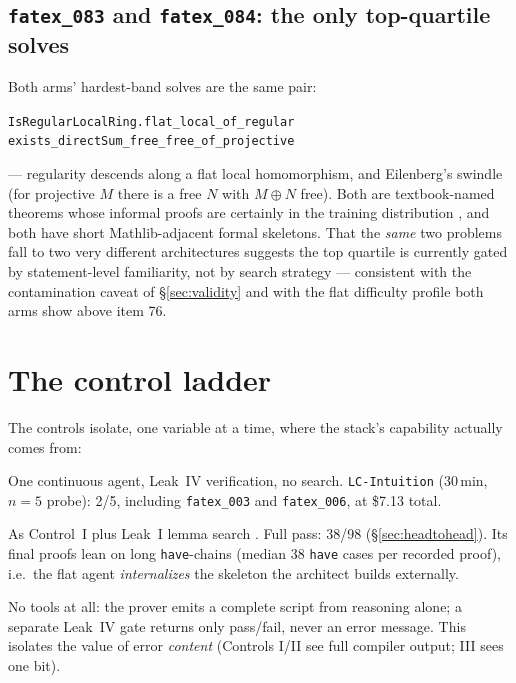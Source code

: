 \documentclass[12pt, a4paper]{article}
\newcommand{\run}[1]{\texttt{#1}}
\begin{document}
\subsection{\run{fatex\_083} and \run{fatex\_084}: the only top-quartile solves}

Both arms' hardest-band solves are the same pair:
\begin{center}\small
\run{IsRegularLocalRing.flat\_local\_of\_regular}\\
\run{exists\_directSum\_free\_free\_of\_projective}
\end{center}
\noindent
--- regularity descends along a flat local homomorphism, and Eilenberg's
swindle (for projective $M$ there is a free $N$ with $M \oplus N$ free). Both are
textbook-named theorems whose informal proofs are certainly in the training
distribution \cite{anthropic2026sonnet5}, and both have short Mathlib-adjacent
formal skeletons. That the \emph{same} two problems fall to two very
different architectures suggests the top quartile is currently gated by
statement-level familiarity, not by search strategy --- consistent with the
contamination caveat of \S\ref{sec:validity} and with the flat difficulty
profile both arms show above item 76.

\section{The control ladder}
\label{sec:controls}

The controls isolate, one variable at a time, where the stack's capability
actually comes from:

\begin{description}[itemsep=2pt]
\item[Control I --- compiler only.] One continuous agent, Leak~IV verification,
  no search. \run{LC-Intuition} (30\,min, $n{=}5$ probe): 2/5, including
  \run{fatex\_003} and \run{fatex\_006}, at \$7.13 total.
\item[Control II --- compiler + search.] As Control~I plus Leak~I lemma search
  \cite{loogle}. Full pass: 38/98 (\S\ref{sec:headtohead}). Its final proofs
  lean on long \texttt{have}-chains (median 38 \texttt{have} cases per
  recorded proof), i.e.\ the flat agent \emph{internalizes} the skeleton the
  architect builds externally.
\item[Control III --- blind prover.] No tools at all: the prover emits a
  complete script from reasoning alone; a separate Leak~IV gate returns only
  pass/fail, never an error message. This isolates the value of error
  \emph{content} (Controls I/II see full compiler output; III sees one bit).
\end{description}
\end{document}
